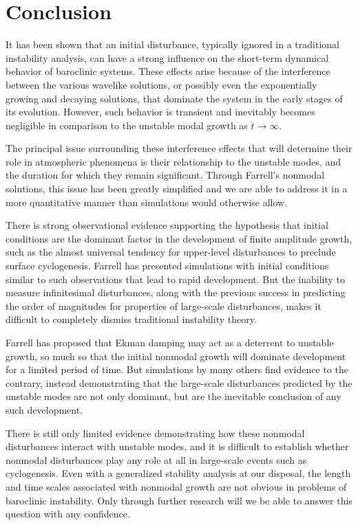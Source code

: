 \documentclass[letterpaper,11pt,onecolumn,twoside,titlepage]{article}
\begin{document}
\section{Conclusion}

It has been shown that an initial disturbance, typically ignored in a traditional instability analysis, can have a strong influence on the short-term dynamical behavior of baroclinic systems. These effects arise because of the interference between the various wavelike solutions, or possibly even the exponentially growing and decaying solutions, that dominate the system in the early stages of its evolution. However, such behavior is transient and inevitably becomes negligible in comparison to the unstable modal growth as $t \rightarrow \infty$.

The principal issue surrounding these interference effects that will determine their role in atmospheric phenomena is their relationship to the unstable modes, and the duration for which they remain significant. Through Farrell's nonmodal solutions, this issue has been greatly simplified and we are able to address it in a more quantitative manner than simulations would otherwise allow.

There is strong observational evidence supporting the hypothesis that initial conditions are the dominant factor in the development of finite amplitude growth, such as the almost universal tendency for upper-level disturbances to preclude surface cyclogenesis. Farrell has presented simulations with initial conditions similar to such observations that lead to rapid development. But the inability to measure infinitesimal disturbances, along with the previous success in predicting the order of magnitudes for properties of large-scale disturbances, makes it difficult to completely dismiss traditional instability theory.

Farrell has proposed that Ekman damping may act as a deterrent to unstable growth, so much so that the initial nonmodal growth will dominate development for a limited period of time. But simulations by many others find evidence to the contrary, instead demonstrating that the large-scale disturbances predicted by the unstable modes are not only dominant, but are the inevitable conclusion of any such development.

There is still only limited evidence demonstrating how these nonmodal disturbances interact with unstable modes, and it is difficult to establish whether nonmodal disturbances play any role at all in large-scale events such as cyclogenesis. Even with a generalized stability analysis at our disposal, the length and time scales associated with nonmodal growth are not obvious in problems of baroclinic instability. Only through further research will we be able to answer this question with any confidence.
\end{document}

